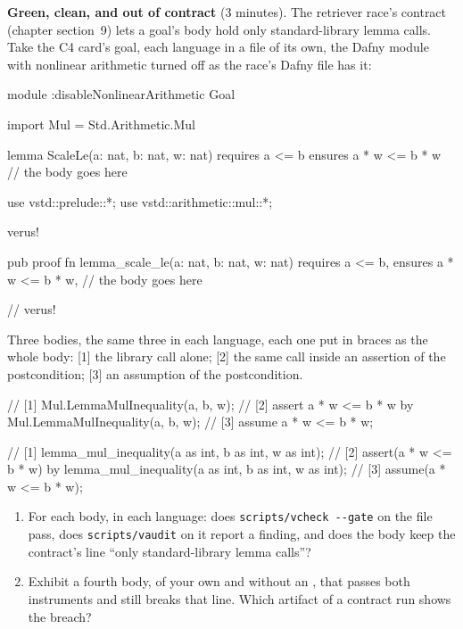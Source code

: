 \documentclass[11pt]{article}
\begin{document}
\begin{problem}[concept]\label{prob:B2}
\textbf{Green, clean, and out of contract} (3 minutes). The retriever race's
contract (chapter section~9) lets a goal's body hold only standard-library
lemma calls. Take the C4 card's goal, each language in a file of its own, the
Dafny module with nonlinear arithmetic turned off as the race's Dafny file has
it:
\begin{dafnycode}
module {:disableNonlinearArithmetic} Goal {
  import Mul = Std.Arithmetic.Mul

  lemma ScaleLe(a: nat, b: nat, w: nat)
    requires a <= b
    ensures a * w <= b * w
  // the body goes here
}
\end{dafnycode}
\begin{veruscode}
use vstd::prelude::*;
use vstd::arithmetic::mul::*;

verus! {

pub proof fn lemma_scale_le(a: nat, b: nat, w: nat)
    requires
        a <= b,
    ensures
        a * w <= b * w,
// the body goes here

} // verus!
\end{veruscode}
Three bodies, the same three in each language, each one put in braces as the
whole body: [1] the library call alone; [2] the same call inside an assertion
of the postcondition; [3] an assumption of the postcondition.
\begin{dafnycode}
// [1]
Mul.LemmaMulInequality(a, b, w);
// [2]
assert a * w <= b * w by {
  Mul.LemmaMulInequality(a, b, w);
}
// [3]
assume a * w <= b * w;
\end{dafnycode}
\begin{veruscode}
// [1]
lemma_mul_inequality(a as int, b as int, w as int);
// [2]
assert(a * w <= b * w) by {
    lemma_mul_inequality(a as int, b as int, w as int);
}
// [3]
assume(a * w <= b * w);
\end{veruscode}
\begin{enumerate}
\item[(a)] For each body, in each language: does \verb+scripts/vcheck --gate+
  on the file pass, does \texttt{scripts/vaudit} on it report a finding, and
  does the body keep the contract's line ``only standard-library lemma
  calls''?
\item[(b)] Exhibit a fourth body, of your own and without an , that
  passes both instruments and still breaks that line. Which artifact of a
  contract run shows the breach?
\end{enumerate}
\end{problem}
\end{document}
